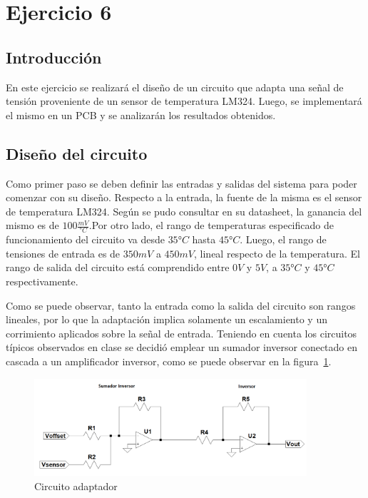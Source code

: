 
\section{Ejercicio 6}

\subsection{Introducción}

En este ejercicio se realizará el diseño de un circuito que adapta una señal de tensión proveniente de un sensor de temperatura LM324. 
Luego, se implementará el mismo en un PCB y se analizarán los resultados obtenidos.

\subsection{Diseño del circuito}

Como primer paso se deben definir las entradas y salidas del sistema para poder comenzar con su diseño. Respecto a la entrada, la fuente de la misma es el sensor de temperatura LM324.
 Según se pudo consultar en su datasheet, la ganancia del mismo es de $100 \frac{mV}{°C}$.Por otro lado, el rango de temperaturas especificado de funcionamiento del circuito va desde $35°C$ hasta $45°C$.
 Luego, el rango de tensiones de entrada es de $350mV$ a $450mV$, lineal respecto de la temperatura. El rango de salida del circuito está comprendido entre $0V$ y $5V$, a  $35°C$ y $45°C$ respectivamente. 

 
 Como se puede observar, tanto la entrada como la salida del circuito son rangos lineales, por lo que la adaptación implica solamente un escalamiento y un corrimiento aplicados sobre la señal de entrada.
  Teniendo en cuenta los circuitos típicos observados en clase se decidió emplear un sumador inversor conectado en cascada a un amplificador inversor, como se puede observar en la figura~\ref{fig:EJ6_circuito}.  
  
\begin{figure}[H]
    \centering
    \includegraphics[width=0.9\textwidth]{../EJ6/Captures/EJ6_circuito_teorico}
    \caption{Circuito adaptador}
    \label{fig:EJ6_circuito} 
\end{figure}

